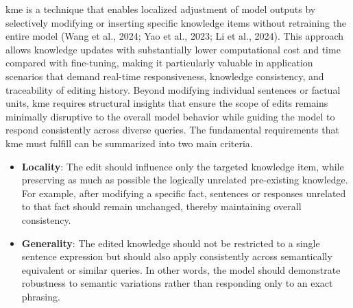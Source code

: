 \documentclass[a4paper,fleqn]{cas-sc}
\begin{document}
\gls{kme} is a technique that enables localized adjustment of model outputs by selectively modifying or inserting specific knowledge items without retraining the entire model (Wang et al., 2024; Yao et al., 2023; Li et al., 2024). This approach allows knowledge updates with substantially lower computational cost and time compared with fine-tuning, making it particularly valuable in application scenarios that demand real-time responsiveness, knowledge consistency, and traceability of editing history. Beyond modifying individual sentences or factual units, \gls{kme} requires structural insights that ensure the scope of edits remains minimally disruptive to the overall model behavior while guiding the model to respond consistently across diverse queries. The fundamental requirements that \gls{kme} must fulfill can be summarized into two main criteria.

\begin{itemize}
    \item{\textbf{Locality}:
    The edit should influence only the targeted knowledge item, while preserving as much as possible the logically unrelated pre-existing knowledge. For example, after modifying a specific fact, sentences or responses unrelated to that fact should remain unchanged, thereby maintaining overall consistency.}

    \item{\textbf{Generality}:
    The edited knowledge should not be restricted to a single sentence expression but should also apply consistently across semantically equivalent or similar queries. In other words, the model should demonstrate robustness to semantic variations rather than responding only to an exact phrasing.}

\end{itemize}
\end{document}
